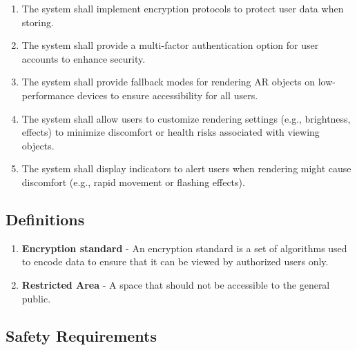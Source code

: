 \documentclass{article}
\begin{document}
\begin{enumerate}[label=\textbf{SR-\arabic*},ref=SR-\arabic*]
    \item \label{SR-5} The system shall implement encryption protocols to protect user data when storing.
    \item \label{SR-6} The system shall provide a multi-factor authentication option for user accounts to enhance security.
    \item \label{SR-7} The system shall provide fallback modes for rendering AR objects on low-performance devices to ensure accessibility for all users.
    \item \label{SR-8} The system shall allow users to customize rendering settings (e.g., brightness, effects) to minimize discomfort or health risks associated with viewing objects.
    \item \label{SR-9} The system shall display indicators to alert users when rendering might cause discomfort (e.g., rapid movement or flashing effects).
\end{enumerate}
\subsection{Definitions}

\begin{enumerate}
    \item \label{encryption standard} \textbf{Encryption standard} - An encryption standard is a set of algorithms used to encode data to ensure that it can be viewed by authorized users only.
    \item \label{restricted area} \textbf{Restricted Area} - A space that should not be accessible to the general public.
\end{enumerate}

\subsection{Safety Requirements}
\end{document}
